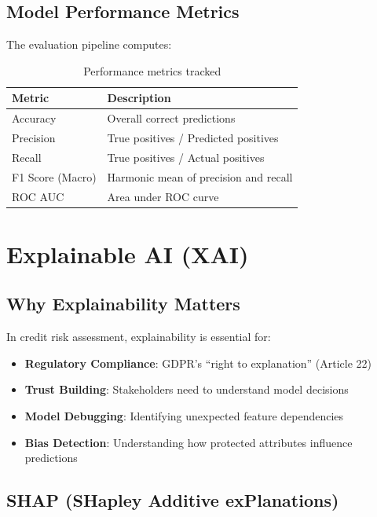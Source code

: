\documentclass[11pt,a4paper]{article}
\begin{document}
\subsection{Model Performance Metrics}

The evaluation pipeline computes:

\begin{table}[H]
\centering
\begin{tabular}{@{}ll@{}}
\toprule
\textbf{Metric} & \textbf{Description} \\
\midrule
Accuracy & Overall correct predictions \\
Precision & True positives / Predicted positives \\
Recall & True positives / Actual positives \\
F1 Score (Macro) & Harmonic mean of precision and recall \\
ROC AUC & Area under ROC curve \\
\bottomrule
\end{tabular}
\caption{Performance metrics tracked}
\end{table}

\section{Explainable AI (XAI)}

\subsection{Why Explainability Matters}

In credit risk assessment, explainability is essential for:
\begin{itemize}
    \item \textbf{Regulatory Compliance}: GDPR's ``right to explanation'' (Article 22)
    \item \textbf{Trust Building}: Stakeholders need to understand model decisions
    \item \textbf{Model Debugging}: Identifying unexpected feature dependencies
    \item \textbf{Bias Detection}: Understanding how protected attributes influence predictions
\end{itemize}

\subsection{SHAP (SHapley Additive exPlanations)}
\end{document}
